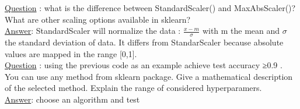 \underline{Question} : what is the difference between StandardScaler() and MaxAbsScaler()? What are other scaling options available in sklearn? \\
\underline{Answer}: StandardScaler will normalize the data : $\frac{x-m}{\sigma}$ with m the mean and $\sigma$ the standard deviation of data. It differs from StandarScaler because absolute values are mapped in the range [0,1]. \\

\underline{Question} : using the previous code as an example achieve test accuracy  ≥0.9 . You can use any method from sklearn package. Give a mathematical description of the selected method. Explain the range of considered hyperparamers.\\
\underline{Answer}: choose an algorithm and test


